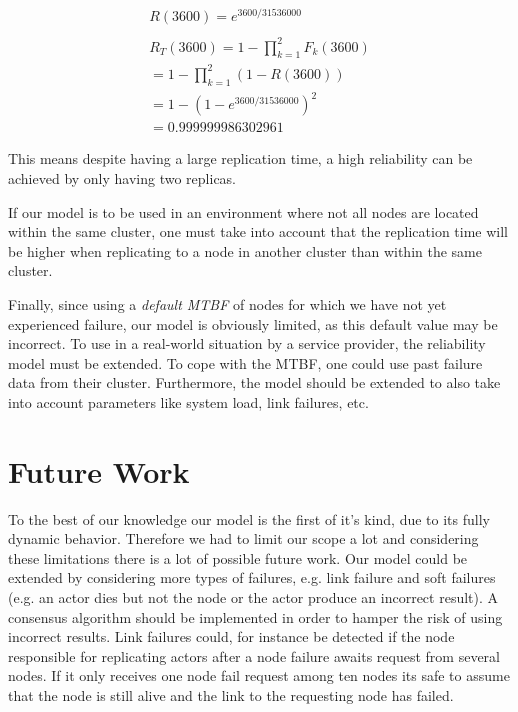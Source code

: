 \documentclass{cslthse-msc}
\begin{document}
\begin{equation*}
\begin{split}
R(3600) = e^{3600/31536000}\\
\\
R_{T}(3600) = 1 - \prod\limits_{k=1}^2 F_{k}(3600)\\
= 1 - \prod\limits_{k=1}^2 (1 - R(3600))\\
= 1 - (1 - e^{3600/31536000})^2\\
= 0.999999986302961
\end{split}
\end{equation*}

This means despite having a large replication time, a high reliability can be achieved by only having two replicas.

If our model is to be used in an environment where not all nodes are located within the same cluster, one must take into account that the replication time will be higher when replicating to a node in another cluster than within the same cluster.

Finally, since using a \emph{default MTBF} of nodes for which we have not yet experienced failure, our model is obviously limited, as this default value may be incorrect. To use in a real-world situation by a service provider, the reliability model must be extended. To cope with the MTBF, one could use past failure data from their cluster. Furthermore, the model should be extended to also take into account parameters like system load, link failures, etc. 



\chapter{Future Work} \label{ch:future_work}
To the best of our knowledge our model is the first of it's kind, due to its fully dynamic behavior. Therefore we had to limit our scope a lot and considering these limitations there is a lot of possible future work. Our model could be extended by considering more types of failures, e.g. link failure and soft failures (e.g. an actor dies but not the node or the actor produce an incorrect result). A consensus algorithm should be implemented in order to hamper the risk of using incorrect results. Link failures could, for instance be detected if the node responsible for replicating actors after a node failure awaits request from several nodes. If it only receives one node fail request among ten nodes its safe to assume that the node is still alive and the link to the requesting node has failed.
\end{document}
